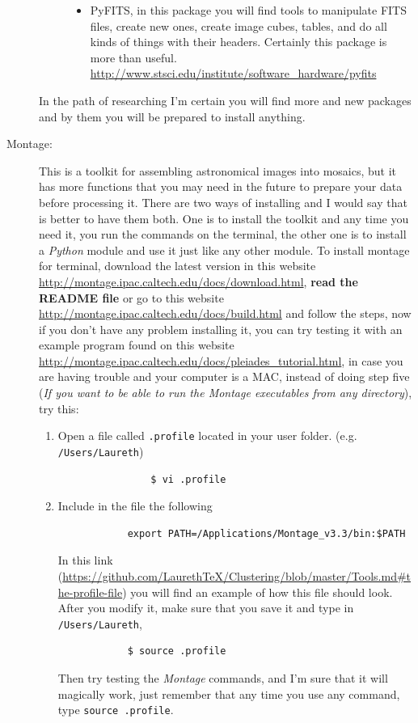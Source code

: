 \documentclass[11pt,fleqn]{book} %
\begin{document}
\begin{description}
\begin{description}
\begin{itemize}
                \item PyFITS, in this package you will find tools to manipulate FITS files, create new ones, create image cubes, tables, and do all kinds of things with their headers. Certainly this package is more than useful. \url{http://www.stsci.edu/institute/software_hardware/pyfits}
            \end{itemize}
    \end{description}
    In the path of researching I'm certain you will find more and new packages and by them you will be prepared to install anything.
    \item[Montage: ]This is a toolkit for assembling astronomical images into mosaics, but it has more functions that you may need in the future to prepare your data before processing it. There are two ways of installing and I would say that is better to have them both. One is to install the toolkit and any time you need it, you run the commands on the terminal, the other one is to install a \emph{Python} module and use it just like any other module.
    To install montage for terminal, download the latest version in this website \url{http://montage.ipac.caltech.edu/docs/download.html}, \textbf{read the README file} or go to this website \url{http://montage.ipac.caltech.edu/docs/build.html} and follow the steps, now if you don't have any problem installing it, you can try testing it with an example program found on this website \url{http://montage.ipac.caltech.edu/docs/pleiades_tutorial.html}, in case you are having trouble and your computer is a MAC, instead of doing step five (\emph{If you want to be able to run the Montage executables from any directory}), try this:
    
    \begin{enumerate}
    	\item Open a file called \verb|.profile| located in your user folder. (e.g. \verb|/Users/Laureth|)
        	\begin{verbatim}
            	$ vi .profile
            \end{verbatim}
         \item Include in the file the following
           \begin{verbatim}
           	export PATH=/Applications/Montage_v3.3/bin:$PATH
           \end{verbatim}
           In this link (\url{https://github.com/LaurethTeX/Clustering/blob/master/Tools.md#the-profile-file}) you will find an example of how this file should look. After you modify it, make sure that you save it and type in \verb|/Users/Laureth|,
           \begin{verbatim}
           	$ source .profile
           \end{verbatim}
           Then try testing the \emph{Montage} commands, and I'm sure that it will magically work, just remember that any time you use any command, type \verb|source .profile|.\\
            

\end{enumerate}
\end{description}
\end{document}
